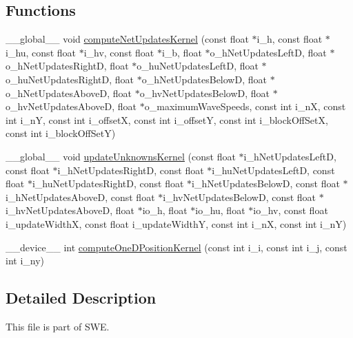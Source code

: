 \subsection*{Functions}
\begin{DoxyCompactItemize}
\item 
\-\_\-\-\_\-global\-\_\-\-\_\- void \hyperlink{SWE__WavePropagationBlockCuda__kernels_8cu_a2775c5e9334da3fec8b5500a3172c938}{compute\-Net\-Updates\-Kernel} (const float $\ast$i\-\_\-h, const float $\ast$i\-\_\-hu, const float $\ast$i\-\_\-hv, const float $\ast$i\-\_\-b, float $\ast$o\-\_\-h\-Net\-Updates\-Left\-D, float $\ast$o\-\_\-h\-Net\-Updates\-Right\-D, float $\ast$o\-\_\-hu\-Net\-Updates\-Left\-D, float $\ast$o\-\_\-hu\-Net\-Updates\-Right\-D, float $\ast$o\-\_\-h\-Net\-Updates\-Below\-D, float $\ast$o\-\_\-h\-Net\-Updates\-Above\-D, float $\ast$o\-\_\-hv\-Net\-Updates\-Below\-D, float $\ast$o\-\_\-hv\-Net\-Updates\-Above\-D, float $\ast$o\-\_\-maximum\-Wave\-Speeds, const int i\-\_\-n\-X, const int i\-\_\-n\-Y, const int i\-\_\-offset\-X, const int i\-\_\-offset\-Y, const int i\-\_\-block\-Off\-Set\-X, const int i\-\_\-block\-Off\-Set\-Y)
\item 
\-\_\-\-\_\-global\-\_\-\-\_\- void \hyperlink{SWE__WavePropagationBlockCuda__kernels_8cu_a197efaeb6b594e3a4150fe2cbe2982db}{update\-Unknowns\-Kernel} (const float $\ast$i\-\_\-h\-Net\-Updates\-Left\-D, const float $\ast$i\-\_\-h\-Net\-Updates\-Right\-D, const float $\ast$i\-\_\-hu\-Net\-Updates\-Left\-D, const float $\ast$i\-\_\-hu\-Net\-Updates\-Right\-D, const float $\ast$i\-\_\-h\-Net\-Updates\-Below\-D, const float $\ast$i\-\_\-h\-Net\-Updates\-Above\-D, const float $\ast$i\-\_\-hv\-Net\-Updates\-Below\-D, const float $\ast$i\-\_\-hv\-Net\-Updates\-Above\-D, float $\ast$io\-\_\-h, float $\ast$io\-\_\-hu, float $\ast$io\-\_\-hv, const float i\-\_\-update\-Width\-X, const float i\-\_\-update\-Width\-Y, const int i\-\_\-n\-X, const int i\-\_\-n\-Y)
\item 
\-\_\-\-\_\-device\-\_\-\-\_\- int \hyperlink{SWE__WavePropagationBlockCuda__kernels_8cu_a81a6caf9f123b73b49c0bf888cdef096}{compute\-One\-D\-Position\-Kernel} (const int i\-\_\-i, const int i\-\_\-j, const int i\-\_\-ny)
\end{DoxyCompactItemize}


\subsection{Detailed Description}
This file is part of S\-W\-E.

